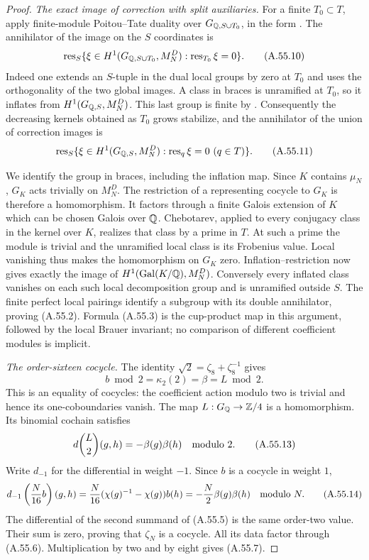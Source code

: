 \begin{proof}
\emph{The exact image of correction with split auxiliaries.}
For a finite $T_0\subset T$, apply finite-module Poitou--Tate
duality over $G_{\mathbb Q,S\cup T_0}$, in the form
\cite[I, Theorem 4.10(b)]{BIR_MilneADT}.
The annihilator of the image on the $S$ coordinates is
\[
 \operatorname{res}_S\{\xi\in H^1(G_{\mathbb Q,S\cup T_0},M_N^D):
                           \operatorname{res}_{T_0}\xi=0\}.
 \tag{A.55.10}
\]
Indeed one extends an $S$-tuple in the dual local groups by
zero at $T_0$ and uses the orthogonality of the two global
images.  A class in braces is unramified at $T_0$, so it
inflates from $H^1(G_{\mathbb Q,S},M_N^D)$.  This last group is
finite by \cite[I, Corollary 4.15]{BIR_MilneADT}.
Consequently the decreasing kernels obtained as $T_0$ grows
stabilize, and the annihilator of the union of correction
images is
\[
 \operatorname{res}_S\{\xi\in H^1(G_{\mathbb Q,S},M_N^D):
                            \operatorname{res}_q\xi=0\ (q\in T)\}.
 \tag{A.55.11}
\]

We identify the group in braces, including the inflation map.
Since $K$ contains $\mu_N$, $G_K$ acts trivially on $M_N^D$.
The restriction of a representing cocycle to $G_K$ is
therefore a homomorphism.  It factors through a finite Galois
extension of $K$ which can be chosen Galois over $\mathbb Q$.
Chebotarev, applied to every conjugacy class in the kernel
over $K$, realizes that class by a prime in $T$.  At such a
prime the module is trivial and the unramified local class
is its Frobenius value.  Local vanishing thus makes the
homomorphism on $G_K$ zero.  Inflation--restriction now gives
exactly the image of
$H^1(\operatorname{Gal}(K/\mathbb Q),M_N^D)$.
Conversely every inflated class vanishes on each such local
decomposition group and is unramified outside $S$.
The finite perfect local pairings identify a subgroup with
its double annihilator, proving (A.55.2).  Formula (A.55.3)
is the cup-product map in this argument, followed by the
local Brauer invariant; no comparison of different coefficient
modules is implicit.

\emph{The order-sixteen cocycle.}
The identity $\sqrt2=\zeta_8+\zeta_8^{-1}$ gives
\[
                   b\bmod2=\kappa_2(2)=\beta=L\bmod2.
 \tag{A.55.12}
\]
This is an equality of cocycles: the coefficient action
modulo two is trivial and hence its one-coboundaries vanish.
The map $L:G_\mathbb Q\to\mathbb Z/4$ is a homomorphism.  Its binomial
cochain satisfies
\[
 d\binom L2(g,h)=-\beta(g)\beta(h)\quad\hbox{modulo }2.
 \tag{A.55.13}
\]
Write $d_{-1}$ for the differential in weight $-1$.
Since $b$ is a cocycle in weight $1$,
\[
 d_{-1}\left(\frac N{16}b\right)(g,h)
 =\frac N{16}(\chi(g)^{-1}-\chi(g))b(h)
 =-\frac N2\beta(g)\beta(h)\quad\hbox{modulo }N.
 \tag{A.55.14}
\]
The differential of the second summand of (A.55.5) is the
same order-two value.  Their sum is zero, proving that
$\zeta_N$ is a cocycle.  All its data factor through (A.55.6).
Multiplication by two and by eight gives (A.55.7).


\end{proof}
